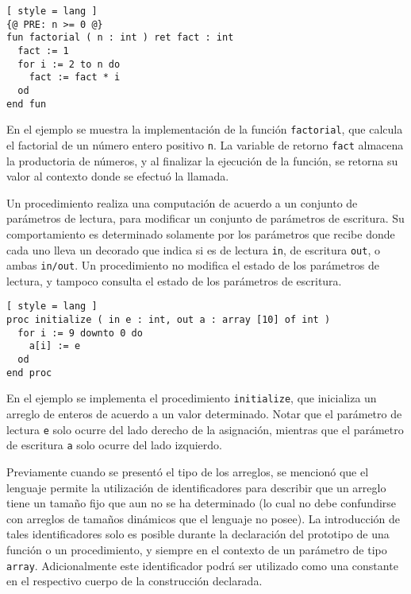 \begin{lstlisting}[ style = lang ]
{@ PRE: n >= 0 @}
fun factorial ( n : int ) ret fact : int
  fact := 1
  for i := 2 to n do
    fact := fact * i
  od
end fun
\end{lstlisting}

En el ejemplo se muestra la implementación de la función \lstinline[style = lang]{factorial}, que calcula el factorial de un número entero positivo \lstinline[style = lang]{n}.
La variable de retorno \lstinline[style = lang]{fact} almacena la productoria de números, y al finalizar la ejecución de la función, se retorna su valor al contexto donde se efectuó la llamada.

Un procedimiento realiza una computación de acuerdo a un conjunto de parámetros de lectura, para modificar un conjunto de parámetros de escritura.
Su comportamiento es determinado solamente por los parámetros que recibe donde cada uno lleva un decorado que indica si es de lectura \lstinline[style = lang]{in}, de escritura \lstinline[style = lang]{out}, o ambas \lstinline[style = lang]{in/out}.
Un procedimiento no modifica el estado de los parámetros de lectura, y tampoco consulta el estado de los parámetros de escritura.

\begin{lstlisting}[ style = lang ]
proc initialize ( in e : int, out a : array [10] of int )
  for i := 9 downto 0 do
    a[i] := e
  od
end proc
\end{lstlisting}

En el ejemplo se implementa el procedimiento \lstinline[style = lang]{initialize}, que inicializa un arreglo de enteros de acuerdo a un valor determinado.
Notar que el parámetro de lectura \lstinline[style = lang]{e} solo ocurre del lado derecho de la asignación, mientras que el parámetro de escritura \lstinline[style = lang]{a} solo ocurre del lado izquierdo.

Previamente cuando se presentó el tipo de los arreglos, se mencionó que el lenguaje permite la utilización de identificadores para describir que un arreglo tiene un tamaño fijo que aun no se ha determinado (lo cual no debe confundirse con arreglos de tamaños dinámicos que el lenguaje no posee).
La introducción de tales identificadores solo es posible durante la declaración del prototipo de una función o un procedimiento, y siempre en el contexto de un parámetro de tipo \lstinline[style = lang]{array}.
Adicionalmente este identificador podrá ser utilizado como una constante en el respectivo cuerpo de la construcción declarada.

